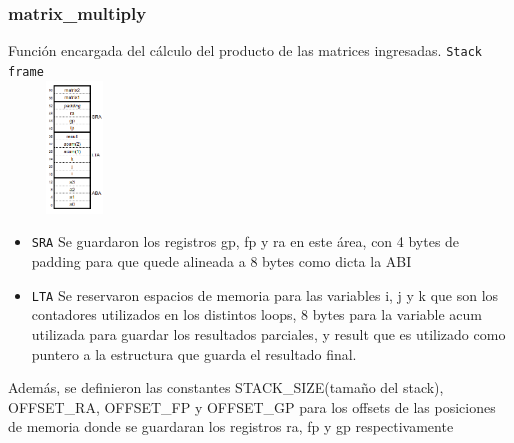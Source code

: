 \documentclass[a4paper,10pt, spanish]{article}
\begin{document}
\subsubsection{matrix\_multiply}
Función encargada del cálculo del producto de las matrices ingresadas.
    \lstinline{Stack frame} \\
            \includegraphics[max height=100pt,max width=100pt]{./stack_matrix_multiply.png}
            \begin{itemize}
                \item \lstinline{SRA}
                Se guardaron los registros gp, fp y ra en este área, con 4 bytes de padding para que quede alineada a 8 bytes como dicta la ABI
                \item \lstinline{LTA}
                Se reservaron espacios de memoria para las variables i, j y k que son los contadores utilizados en los distintos loops, 8 bytes para la variable acum utilizada para guardar los resultados parciales, y result que es utilizado como puntero a la estructura que guarda el resultado final.
            \end{itemize}

            \lstinline{} Además, se definieron las constantes STACK\_SIZE(tamaño del stack), OFFSET\_RA, OFFSET\_FP y OFFSET\_GP para los offsets de las posiciones de memoria donde se guardaran los registros ra, fp y gp respectivamente
\end{document}
